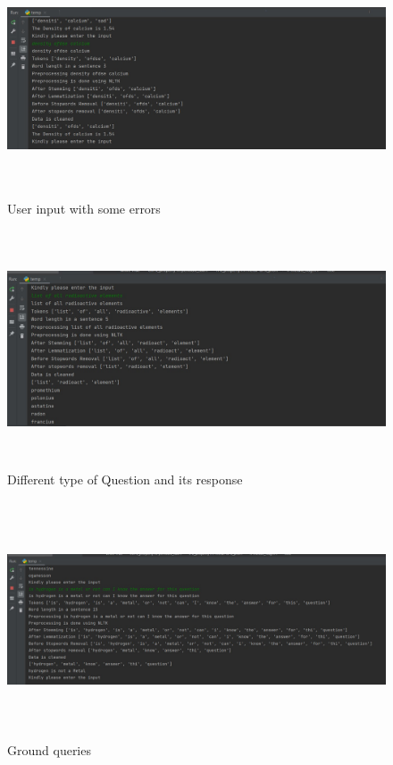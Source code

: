 \documentclass{article}
\begin{document}
\begin{figure}[htp]
    \centering
    \includegraphics[width=15cm, height = 7cm]{Images/sc-3.jpg}
    \caption{User input with some errors}
    \label{fig:Example 3}
\end{figure}

\begin{figure}[htp]
    \centering
    \includegraphics[width=15cm, height = 7cm]{Images/sc-4.jpg}
    \caption{Different type of Question and its response}
    \label{fig:Example 4}
\end{figure}

\begin{figure}[htp]
    \centering
    \includegraphics[width=15cm, height = 7cm]{Images/sc-5.jpg}
    \caption{Ground queries}
    \label{fig: Example 5}
\end{figure}
\end{document}
